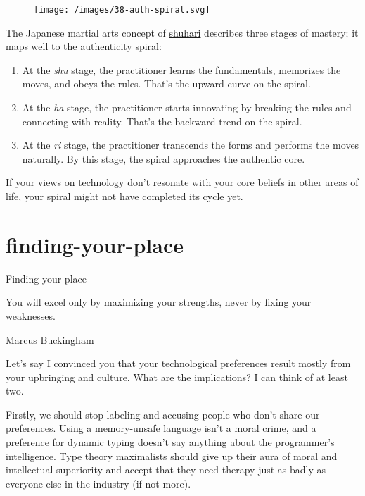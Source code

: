 \documentclass{article}
\begin{document}
\begin{figure}[medium-size,grayscale-diagram]
\texttt{[image: /images/38-auth-spiral.svg]}
\end{figure}

The Japanese martial arts concept of \href{https://en.wikipedia.org/wiki/Shuhari}{shuhari} describes three stages of mastery;
it maps well to the authenticity spiral:
\begin{enumerate}
\item At the \emph{shu} stage, the practitioner learns the fundamentals, memorizes the moves, and obeys the rules.
That's the upward curve on the spiral.
\item At the \emph{ha} stage, the practitioner starts innovating by breaking the rules and connecting with reality.
That's the backward trend on the spiral.
\item At the \emph{ri} stage, the practitioner transcends the forms and performs the moves naturally.
By this stage, the spiral approaches the authentic core.
\end{enumerate}

If your views on technology don't resonate with your core beliefs in other areas of life,
your spiral might not have completed its cycle yet.

\section{finding-your-place}{Finding your place}

\epigraph{
You will excel only by maximizing your strengths, never by fixing your weaknesses.
}{Marcus Buckingham}

Let's say I convinced you that your technological preferences result mostly from your upbringing and culture.
What are the implications? I can think of at least two.

Firstly, we should stop labeling and accusing people who don't share our preferences.
Using a memory-unsafe language isn't a moral crime, and a preference for dynamic typing doesn't say anything about the programmer's intelligence.
Type theory maximalists should give up their aura of moral and intellectual superiority and accept that they need therapy just as badly as everyone else in the industry (if not more).
\end{document}
